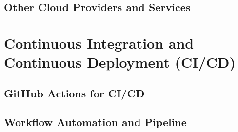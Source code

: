 \subsection{Other Cloud Providers and Services}
\label{subsec:other-cloud-providers}

\section{Continuous Integration and Continuous Deployment (CI/CD)}
\label{sec:cicd}

\subsection{GitHub Actions for CI/CD}
\label{subsec:github-actions-cicd}

\subsection{Workflow Automation and Pipeline}
\label{subsec:workflow-automation-pipeline}
